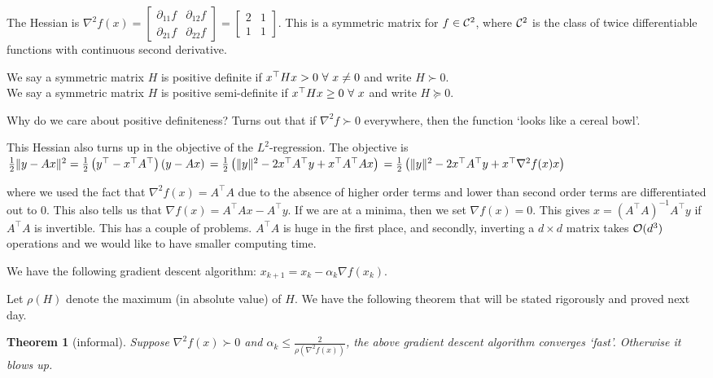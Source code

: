 \documentclass[11pt]{article}
\newcommand{\1}{\mathbbm{1}}
\theoremstyle{plain}
\newtheorem{theorem}{Theorem}[section]
\theoremstyle{definition}
\theoremstyle{remark}
\begin{document}
The Hessian is $\nabla^{2}f(x) = \begin{bmatrix}
\partial_{11}f& \partial_{12}f\\
\partial_{21}f & \partial_{22}f
\end{bmatrix} = 
\begin{bmatrix}
2 & 1\\
1 & 1
\end{bmatrix}$. This is a symmetric matrix for $f\in {\mathcal{C}}^{2}$, where ${\mathcal{C}}^{2}$ is the class of twice differentiable functions with continuous second derivative.

We say a symmetric matrix $H$ is positive definite if $x^{\top}H x > 0 ~\forall~ x\ne 0$ and write $H\succ 0$.\\
We say a symmetric matrix $H$ is positive semi-definite if $x^{\top}H x \ge 0 ~\forall~ x$ and write $H\succeq 0$.

Why do we care about positive definiteness? Turns out that if $\nabla^{2}f\succ 0$ everywhere, then the function `looks like a cereal bowl'.

This Hessian also turns up in the objective of the $L^{2}$-regression. The objective is $
\frac12\norm{y-Ax}{}^{2} = \frac12 \left(y^{\top}-x^{\top}A^{\top}\right)\left( y-Ax \right)\\
= \frac12\left(\norm{y}{}^{2} - 2x^{\top}A^{\top}y  + x^{\top}A^{\top}Ax\right)\\
= \frac12 \left(\norm{y}{}^{2}-2x^{\top}A^{\top}y + x^{\top}\nabla^{2}f(x)x\right)
$

where we used the fact that $\nabla^{2} f(x) = A^{\top}A$ due to the absence of higher order terms and lower than second order terms are differentiated out to $0$. This also tells us that $\nabla f(x) = A^{\top}Ax-A^{\top}y$. If we are at a minima, then we set $\nabla f(x)=0$. This gives $x=\left(A^{\top}A\right)^{-1}A^{\top}y$ if $A^{\top}A$ is invertible. This has a couple of problems. $A^{\top}A$ is huge in the first place, and secondly, inverting a $d\times d$ matrix takes ${\mathcal{O}}(d^{3})$ operations and we would like to have smaller computing time.


We have the following gradient descent algorithm: $x_{k+1} = x_{k} - \alpha_{k} \nabla f(x_{k})$. 

Let $\rho(H)$ denote the maximum (in absolute value) of $H$. We have the following theorem that will be stated rigorously and proved next day.

\begin{theorem}[informal]
Suppose $\nabla^{2}f(x)\succ 0$ and $\alpha_{k} \le \frac{2}{\rho\left(\nabla^{2}f(x)\right)}$, the above gradient descent algorithm converges `fast'. Otherwise it blows up. 
\end{theorem}
















\end{document}
